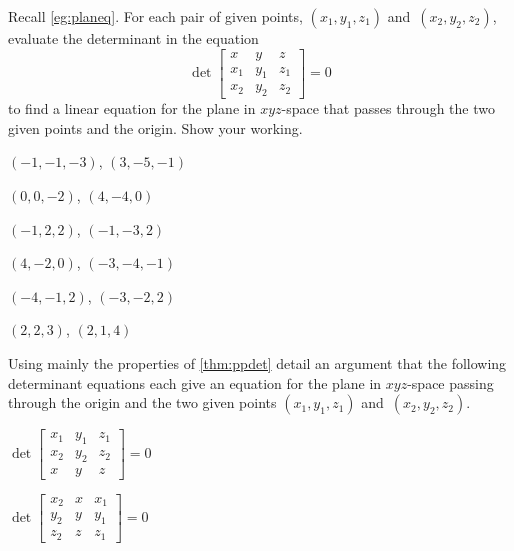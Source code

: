 \begin{exercise}  
Recall \cref{eg:planeq}.
For each pair of given points, \((x_1,y_1,z_1)\) and~\((x_2,y_2,z_2)\), evaluate the determinant in the equation
\begin{equation*}
\det\begin{bmatrix} x&y&z\\x_1&y_1&z_1\\x_2&y_2&z_2 \end{bmatrix}=0
\end{equation*}
to find a linear equation for the plane in \(xyz\)-space that passes through the two given points and the origin.
Show your working.
\begin{Parts}
\item \((-1,-1,-3)\), \((3,-5,-1)\)

\begin{reduce}
\item \((0,0,-2)\), \((4,-4,0)\)

\item \((-1,2,2)\), \((-1,-3,2)\)
\end{reduce}

\item \((4,-2,0)\), \((-3,-4,-1)\)

\item \((-4,-1,2)\), \((-3,-2,2)\)

\item \((2,2,3)\), \((2,1,4)\)

\end{Parts}
\end{exercise}




\begin{exercise}  
Using mainly the properties of \cref{thm:ppdet} detail an argument that the following determinant equations each give an equation for the plane in \(xyz\)-space passing through the origin and the two given points \((x_1,y_1,z_1)\) and~\((x_2,y_2,z_2)\).
\begin{Parts}
\item \(\det\begin{bmatrix} x_1&y_1&z_1
\\x_2&y_2&z_2
\\x&y&z \end{bmatrix}=0\)

\item \(\det\begin{bmatrix} x_2&x&x_1
\\y_2&y&y_1
\\z_2&z&z_1 \end{bmatrix}=0\)

\end{Parts}
\end{exercise}








